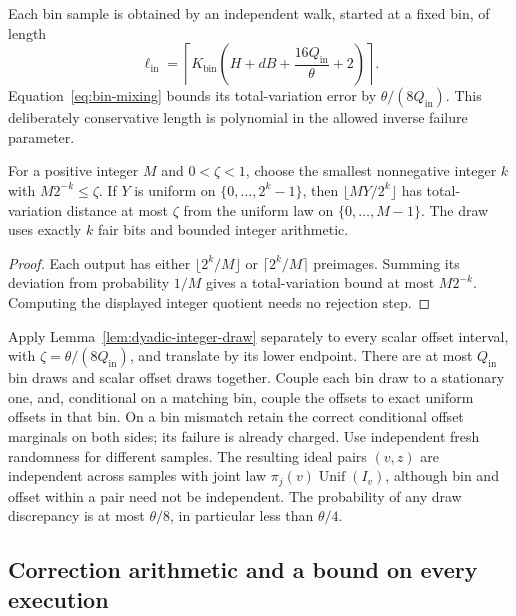 Each bin sample is obtained by an independent walk, started at a fixed
bin, of length
\begin{equation}
 \ell_{\mathrm{in}}=
 \left\lceil K_{\mathrm{bin}}
  \left(H+dB+\frac{16Q_{\mathrm{in}}}{\theta}+2\right)\right\rceil.
 \label{eq:inner-walk-length}
\end{equation}
Equation~\eqref{eq:bin-mixing} bounds its total-variation error by
$\theta/(8Q_{\mathrm{in}})$.  This deliberately conservative length
is polynomial in the allowed inverse failure parameter.

\begin{lemma}
\label{lem:dyadic-integer-draw}
For a positive integer $M$ and $0<\zeta<1$, choose the smallest
nonnegative integer $k$ with $M2^{-k}\le\zeta$.  If $Y$ is uniform on
$\{0,\ldots,2^k-1\}$, then
$\lfloor MY/2^k\rfloor$ has total-variation distance at most $\zeta$
from the uniform law on $\{0,\ldots,M-1\}$.  The draw uses exactly
$k$ fair bits and bounded integer arithmetic.
\end{lemma}

\begin{proof}
Each output has either $\lfloor2^k/M\rfloor$ or
$\lceil2^k/M\rceil$ preimages.  Summing its deviation from probability
$1/M$ gives a total-variation bound at most $M2^{-k}$.  Computing the
displayed integer quotient needs no rejection step.
\end{proof}

Apply Lemma~\ref{lem:dyadic-integer-draw} separately to every scalar
offset interval, with $\zeta=\theta/(8Q_{\mathrm{in}})$, and translate
by its lower endpoint.  There are at most $Q_{\mathrm{in}}$ bin draws
and scalar offset draws together.  Couple each bin draw to a stationary
one, and, conditional on a matching bin, couple the offsets to exact
uniform offsets in that bin.  On a bin mismatch retain the correct
conditional offset marginals on both sides; its failure is already
charged.  Use independent fresh randomness for different samples.
The resulting ideal pairs $(v,z)$ are independent across samples with
joint law $\pi_j(v)\operatorname{Unif}(I_v)$, although bin and offset
within a pair need not be independent.  The probability of any draw
discrepancy is at most $\theta/8$, in particular less than $\theta/4$.

\subsection{Correction arithmetic and a bound on every execution}

